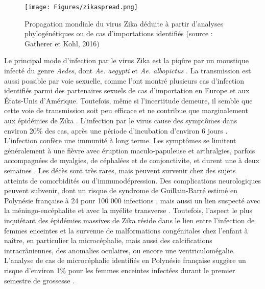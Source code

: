 \begin{figure}[t]
	\centering
	\texttt{[image: Figures/zikaspread.png]}
	\caption{Propagation mondiale du virus Zika déduite à partir d'analyses phylogénétiques ou de cas d'importations identifiés (source : Gatherer et Kohl, 2016)}
	\label{fig:zika2007}
\end{figure}

Le principal mode d'infection par le virus Zika est la piqûre par un moustique infecté du genre {\em Aedes}, dont {\em Ae. aegypti} et {\em Ae. albopictus} \cite{cornet1979transmission,wong2013aedes}.
La transmission est aussi possible par voie sexuelle, comme l'ont montré plusieurs cas d'infection identifiés parmi des partenaires sexuels de cas d'importation en Europe et aux \'Etats-Unis d'Amérique.
Toutefois, même si l'incertitude demeure, il semble que cette voie de transmission soit peu efficace et ne contribue que marginalement aux épidémies de Zika \cite{althaus_how_2016}.
L'infection par le virus cause des symptômes dans environ 20\% des cas, après une période d'incubation d'environ 6 jours \cite{lessler2016times}.
L'infection confère une immunité à long terme. 
Les symptômes se limitent généralement à une fièvre avec éruption maculo-papuleuse et arthralgies, parfois accompagnées de myalgies, de céphalées et de conjonctivite, et durent une à deux semaines \cite{lessler2016assessing}.
Les décès sont très rares, mais peuvent survenir chez des sujets atteints de comorbidités ou d'immunodépression.
Des complications neurologiques peuvent subvenir, dont un risque de syndrome de Guillain-Barré estimé en Polynésie française à 24 pour 100 000 infections \cite{cao2016guillain}, mais aussi un lien suspecté avec la méningo-encéphalite et avec la myélite transverse \cite{lessler2016assessing}.
Toutefois, l'aspect le plus inquiétant des épidémies massives de Zika réside dans le lien entre l'infection de femmes enceintes et la survenue de malformations congénitales chez l'enfant à naître, en particulier la microcéphalie, mais aussi des calcifications intracrâniennes, des anomalies oculaires, ou encore une ventriculomégalie.
L'analyse de cas de microcéphalie identifiés en Polynésie française suggère un risque d'environ 1\% pour les femmes enceintes infectées durant le premier semestre de grossesse \cite{cauchemez_association_2016}.

